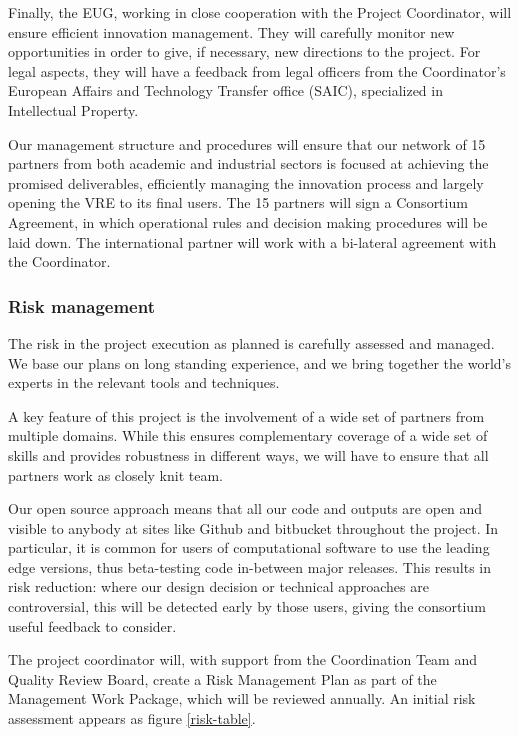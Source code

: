 Finally, the EUG, working in close cooperation with the
Project Coordinator, will ensure efficient innovation
management. They will carefully monitor new opportunities in
order to give, if necessary, new directions to the project. For
legal aspects, they will have a feedback from legal officers from the
Coordinator’s European Affairs and Technology Transfer office (SAIC),
specialized in Intellectual Property.

Our management structure and procedures will ensure that our network
of 15 partners from both academic and industrial sectors is focused at
achieving the promised deliverables, efficiently managing the
innovation process and largely opening the VRE to its final users. The
15 partners will sign a Consortium Agreement, in which operational
rules and decision making procedures will be laid down. The
international partner will work with a bi-lateral agreement with the
Coordinator.

\subsubsection{Risk management}\label{sec:risks}

The risk in the project execution as planned is carefully assessed and
managed. We base our plans on long standing experience, and we bring
together the world's experts in the relevant tools and techniques.

A key feature of this project is the involvement of a wide set of
partners from multiple domains. While this ensures complementary
coverage of a wide set of skills and provides robustness in different
ways, we will have to ensure that all partners work as closely knit
team. 

Our open source approach means that all our code and outputs
are open and visible to anybody at sites like Github and bitbucket
throughout the project. In particular, it is common for users of
computational software to use the leading edge versions, thus
beta-testing code in-between major releases. This results in risk
reduction: where our design decision or technical approaches are
controversial, this will be detected early by those users, giving the
consortium useful feedback to consider.

The project coordinator will, with support from the Coordination Team
and Quality Review Board, create a Risk Management Plan
 as part of the Management Work Package,
which will be reviewed annually. An initial risk assessment appears
as figure \ref{risk-table}.

